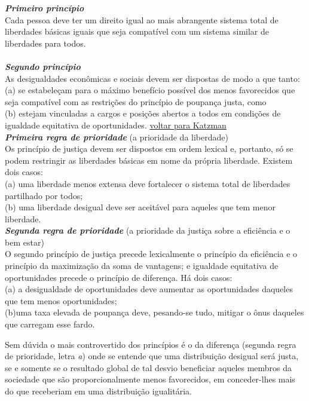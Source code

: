 \documentclass[
	12pt,				%
	openright,			%
	twoside,			%
	a4paper,			%
	chapter=TITLE,		%
	section=TITLE,		%
	subsection=TITLE,	%
	subsubsection=TITLE,%
	spanish,            %
	english,			%
	brazil				%
	]{abntex2}
\begin{document}
\begin{citacao}
	\textbf{\textit{Primeiro princípio}}\\
	Cada pessoa deve ter um direito igual ao mais abrangente sistema total de liberdades básicas iguais que seja compatível com um sistema similar de liberdades para todos.\\\\
	\hypertarget{rawls}{}
	\textbf{\textit{Segundo princípio}}\\
	As desigualdades econômicas e sociais devem ser dispostas de modo a que tanto:\\
	(a) se estabeleçam para o máximo benefício possível dos menos favorecidos que seja compatível com as restrições do princípio de poupança justa, como\\
	(b) estejam vinculadas a cargos e posições abertos a todos em condições de igualdade equitativa de oportunidades. \hyperlink{rawls1}{voltar para Katzman}\\
	\textbf{\textit{Primeira regra de prioridade}} (a prioridade da liberdade)\\
	Os princípio de justiça devem ser dispostos em ordem lexical e, portanto, só se podem restringir as liberdades básicas em nome da própria liberdade. Existem dois casos:\\
	(a) uma liberdade menos extensa deve fortalecer o sistema total de liberdades partilhado por todos;\\
	(b) uma liberdade desigual deve ser aceitável para aqueles que tem menor liberdade.\\
	\textbf{\textit{Segunda regra de prioridade}} (a prioridade da justiça sobre a eficiência e o bem estar)\\
	O segundo princípio de justiça precede lexicalmente o princípio da eficiência e o princípio da maximização da soma de vantagens; e igualdade equitativa de oportunidades precede o princípio de diferença. Há dois casos:\\
	(a) a desigualdade de oportunidades deve aumentar as oportunidades daqueles que tem menos oportunidades;\\
	(b)uma taxa elevada de poupança deve, pesando-se tudo, mitigar o ônus daqueles que carregam esse fardo.\cite[p ~376]{Rawls}
\end{citacao}
\par
Sem dúvida o mais controvertido dos princípios é o da diferença (segunda regra de prioridade, letra \textit{a}) onde se entende que uma distribuição desigual será justa, se e somente se o resultado global de tal desvio beneficiar aqueles membros da sociedade que são proporcionalmente menos favorecidos, em conceder-lhes mais do que receberiam em uma distribuição igualitária.
\end{document}
